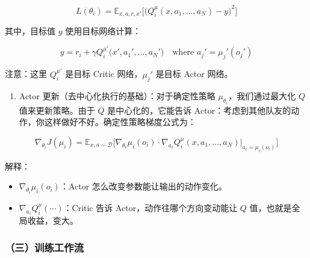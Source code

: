 \[
L(\theta_i)
=
\mathbb{E}_{x,a,r,x'}
\bigl[
\bigl(
Q_i^{\mu}(x,a_1,\ldots,a_N)-y
\bigr)^{2}
\bigr]
\]

其中，目标值 \(y\) 使用目标网络计算：

\[
y
=
r_i
+
\gamma
Q_i^{\mu'}\bigl(
x',
a_1',
\ldots,
a_N'
\bigr)
\quad
\text{where }
a_j'=\mu_j'(o_j')
\]

注意：这里 \(Q_i^{\mu'}\) 是目标 Critic 网络，\(\mu_j'\) 是目标 Actor 网络。

\begin{enumerate}
\def\labelenumi{\arabic{enumi}.}
\setcounter{enumi}{1}
\tightlist
\item
  Actor 更新（去中心化执行的基础）：对于确定性策略 \(\mu_{\theta_i}\)，我们通过最大化 \(Q\) 值来更新策略。由于 \(Q\) 是中心化的，它能告诉 Actor：考虑到其他队友的动作，你这样做好不好。确定性策略梯度公式为：
\end{enumerate}

\[
\nabla_{\theta_i}J(\mu_i)
=
\mathbb{E}_{x,a\sim\mathcal{D}}
\bigl[
\nabla_{\theta_i}\mu_i(o_i)
\cdot
\nabla_{a_i}Q_i^{\mu}(x,a_1,\ldots,a_N)
\big|_{a_i=\mu_i(o_i)}
\bigr]
\]

解释：

\begin{itemize}
\tightlist
\item
  \(\nabla_{\theta_i}\mu_i(o_i)\)：Actor 怎么改变参数能让输出的动作变化。
\item
  \(\nabla_{a_i}Q_i^{\mu}(\cdots)\)：Critic 告诉 Actor，动作往哪个方向变动能让 \(Q\) 值，也就是全局收益，变大。
\end{itemize}

\hypertarget{ux4e09ux8badux7ec3ux5de5ux4f5cux6d41}{%
\subsubsection{（三）训练工作流}\label{ux4e09ux8badux7ec3ux5de5ux4f5cux6d41}}


